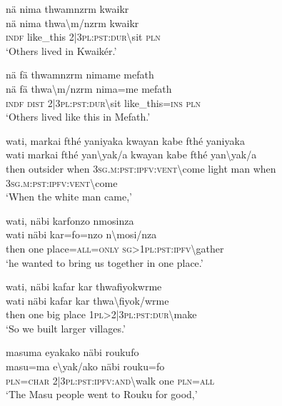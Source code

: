 \ea\label{ex:2:a1708}
nä nima thwamnzrm kwaikr\\
\gll nä	nima	thwa{\textbackslash}m/nzrm	kwaikr\\
     \textsc{indf}	like\_this	2|3\textsc{pl}:\textsc{pst}:\textsc{dur}{\textbackslash}sit	\textsc{pln}\\
\glt `Others lived in Kwaikér.'
\z

\ea\label{ex:2:a1709}
nä fä thwamnzrm nimame mefath\\
\gll nä	fä	thwa{\textbackslash}m/nzrm	nima=me	mefath\\
     \textsc{indf}	\textsc{dist}	2|3\textsc{pl}:\textsc{pst}:\textsc{dur}{\textbackslash}sit	like\_this=\textsc{ins}	\textsc{pln}\\
\glt `Others lived like this in Mefath.'
\z

\ea\label{ex:2:a1711}
wati, markai fthé yaniyaka kwayan kabe fthé yaniyaka\\
\gll wati	markai	fthé	yan{\textbackslash}yak/a	kwayan	kabe	fthé	yan{\textbackslash}yak/a\\
     then	outsider	when	3\textsc{sg}.\textsc{m}:\textsc{pst}:\textsc{ipfv}:\textsc{vent}{\textbackslash}come	light	man	when	3\textsc{sg}.\textsc{m}:\textsc{pst}:\textsc{ipfv}:\textsc{vent}{\textbackslash}come\\
\glt `When the white man came,'
\z

\ea\label{ex:2:a1712}
wati, näbi karfonzo nmosinza\\
\gll wati	näbi	kar=fo=nzo	n{\textbackslash}mosi/nza\\
     then	one	place=\textsc{all}=\textsc{only}	\textsc{sg}>1\textsc{pl}:\textsc{pst}:\textsc{ipfv}{\textbackslash}gather\\
\glt `he wanted to bring us together in one place.'
\z

\ea\label{ex:2:a1713}
wati, näbi kafar kar thwafiyokwrme\\
\gll wati	näbi	kafar	kar	thwa{\textbackslash}fiyok/wrme\\
     then	one	big	place	1\textsc{pl}>2|3\textsc{pl}:\textsc{pst}:\textsc{dur}{\textbackslash}make\\
\glt `So we built larger villages.'
\z

\ea\label{ex:2:a1714}
masuma eyakako näbi roukufo\\
\gll masu=ma	e{\textbackslash}yak/ako	näbi	rouku=fo\\
     \textsc{pln}=\textsc{char}	2|3\textsc{pl}:\textsc{pst}:\textsc{ipfv}:\textsc{and}{\textbackslash}walk	one	\textsc{pln}=\textsc{all}\\
\glt `The Masu people went to Rouku for good,'
\z

